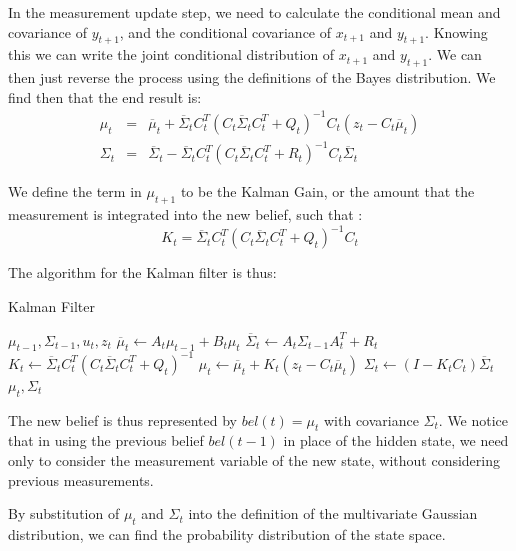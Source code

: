 \documentclass[english]{article}
\begin{document}
In the measurement update step, we need to calculate the conditional mean and covariance of $y_{t+1}$, and the conditional covariance of $x_{t+1}$ and $y_{t+1}$. Knowing this we can write the joint conditional distribution of $x_{t+1}$ and $y_{t+1}$. We can then just reverse the process using the definitions of the Bayes distribution. We find then that the end result is:
\begin{eqnarray}
\mu_{t} &=& \overline{\mu}_{t} + \overline{\Sigma}_{t} C_{t}^T (C_{t} \overline{\Sigma}_{t} C_{t}^T + Q_t)^{-1}C_t (z_{t} - C_{t} \overline{\mu}_{t}) \\
\Sigma_{t} &=& \overline{\Sigma}_{t} - \overline{\Sigma}_{t} C_{t}^T (C_{t} \overline{\Sigma}_{t} C_{t}^T + R_{t})^{-1}C_{t} \overline{\Sigma}_{t}
\end{eqnarray}

We define the term in $\mu_{t+1}$ to be the Kalman Gain, or the amount that the measurement is integrated into the new belief, such that \cite{probrob}:
\begin{equation}
K_{t} = \overline{\Sigma}_{t} C_{t}^T (C_{t} \overline{\Sigma}_{t} C_{t}^T + Q_t)^{-1}C_{t}
\end{equation}

The algorithm for the Kalman filter is thus: \cite{probrob}

\begin{algorithm}[H]
\caption{Kalman Filter}
\label{alg:kalman}
\begin{algorithmic}[1]
	\REQUIRE $\mu_{t-1}, \Sigma_{t-1}, u_t, z_t$
	\STATE $\overline{\mu}_t \leftarrow A_t\mu_{t-1} + B_t \mu_t$
	\STATE $\overline{\Sigma}_t \leftarrow A_t \Sigma_{t-1}A_t^T + R_t$
	\STATE
	\STATE $K_t \leftarrow \overline{\Sigma}_t C_t^T\left(C_t \overline{\Sigma}_t C_t^T + Q_t\right)^{-1}$
	\STATE $\mu_t \leftarrow \overline{\mu}_t + K_t\left(z_t - C_t \overline{\mu}_t\right)$
	\STATE $\Sigma_t \leftarrow (I-K_t C_t)\overline{\Sigma}_t$
	\RETURN $\mu_t, \Sigma_t$
\end{algorithmic}
\end{algorithm}

The new belief is thus represented by $bel(t) = \mu_t$ with covariance $\Sigma_t$. We notice that in using the previous belief $bel(t-1)$ in place of the hidden state, we need only to consider the measurement variable of the new state, without considering previous measurements.

By substitution of $\mu_t$ and $\Sigma_t$ into the definition of the multivariate Gaussian distribution, we can find the probability distribution of the state space.
\end{document}
